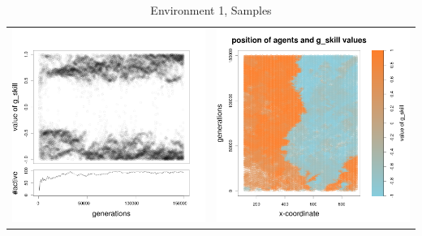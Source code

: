 \documentclass[a4paper,10pt]{article}
\begin{document}
\begin{table}[h!]
\caption{Environment 1, Samples}
 \centering
 \begin{tabular}{cc}
 \includegraphics[width=\imgSize]{images/5StaticEnv/Gplot47_staticEnv1}&\includegraphics[width=\imgSize]{images/5StaticEnv/Gplot47Static_staticEnv1}\\

\end{tabular}
\end{table}
\end{document}
